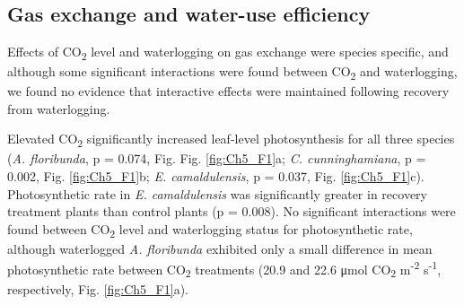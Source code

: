 \documentclass[12pt,a4paper]{memoir}
\begin{document}
\begin{landscape}
\begin{tiny}
\begin{onehalfspacing}
{\begin{longtabu}
\caption[Treatment means, standard deviations and significance of ANOVA models.]{Mean and standard deviation (in parentheses) of measured gas exchange rates, biomass and functional traits for each combination of CO2 level and waterlogging treatments. Significant differences as determined by two-way ANOVA are denoted by the letters NS, C, W or I (NS = no significant effect of either treatment, C = significant effect of CO{\textsubscript{2}} level, W = significant effect of waterlogging treatment, C x W = significant interaction between CO{\textsubscript{2}} level and waterlogging treatment). Where interactions were found, waterlogging treatments in which significant differences between aCO{\textsubscript{2}} and eCO{\textsubscript{2}} were determined by post-hoc tests are denoted by: c = control, w = waterlogged, r = recovery. Significant differences between waterlogging treatments determined by post-hoc tests are denoted using the following script: cw = difference between control and waterlogged measurements, cr = difference between control and recovery measurements, wr = difference between waterlogged and recovery measurements. \newline* interaction effect was marginally significant, but post-hoc analysis confirmed significant differences among treatments.\newline N.B. biomass measurements for waterlogged plants are omitted because these plants were harvested at a younger age than control or recovery plants and are thus not comparable.} \\
\label{tab:Ch5_T2}
\end{longtabu}
}
\end{onehalfspacing}
\end{tiny}
\end{landscape}

\subsection*{Gas exchange and water-use efficiency}
Effects of CO\textsubscript{2} level and waterlogging on gas exchange were species specific, and although some significant interactions were found between CO\textsubscript{2} and waterlogging, we found no evidence that interactive effects were maintained following recovery from waterlogging. 

Elevated CO\textsubscript{2} significantly increased leaf-level photosynthesis for all three species (\textit{A. floribunda}, p = 0.074, Fig. Fig. \ref{fig:Ch5_F1}a; \textit{C. cunninghamiana}, p = 0.002, Fig. \ref{fig:Ch5_F1}b; \textit{E. camaldulensis}, p = 0.037, Fig. \ref{fig:Ch5_F1}c). Photosynthetic rate in \textit{E. camaldulensis} was significantly greater in recovery treatment plants than control plants (p = 0.008). No significant interactions were found between CO\textsubscript{2} level and waterlogging status for photosynthetic rate, although waterlogged \textit{A. floribunda} exhibited only a small difference in mean photosynthetic rate between CO\textsubscript{2} treatments (20.9 and 22.6 μmol CO\textsubscript{2} m\textsuperscript{-2} s\textsuperscript{-1}, respectively, Fig. \ref{fig:Ch5_F1}a).
\end{document}
